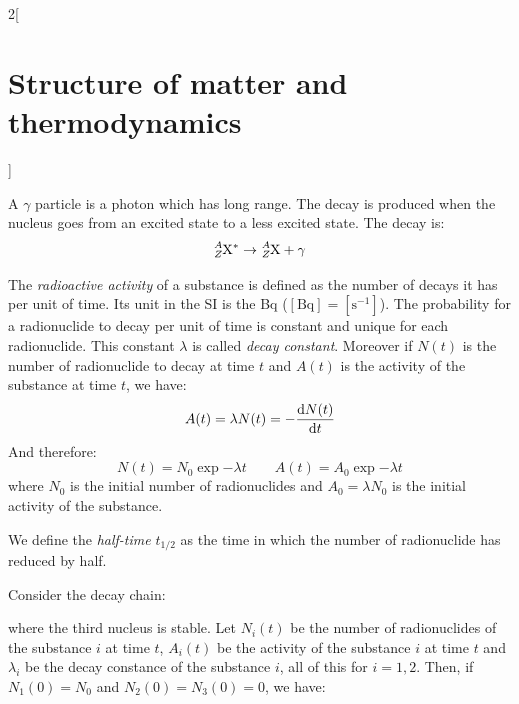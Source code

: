 \documentclass[../../../main.tex]{subfiles}
\begin{document}
\begin{multicols}{2}[\section{Structure of matter and thermodynamics}]
\begin{definition}
\begin{enumerate}
    \end{enumerate}
  \end{definition}
  \begin{definition}
    A $\gamma$ particle is a photon which has long range. The decay is produced when the nucleus goes from an excited state to a less excited state. The decay is: $$\ce{^$A$_$Z$X}^*\rightarrow\ce{^$A$_$Z$X}+\gamma$$
  \end{definition}
  \begin{definition}
    The \emph{radioactive activity} of a substance is defined as the number of decays it has per unit of time. Its unit in the SI is the Bq ($[\text{Bq}]=[\text{s}^{-1}]$). The probability for a radionuclide to decay per unit of time is constant and unique for each radionuclide. This constant $\lambda$ is called \emph{decay constant}. Moreover if $N(t)$ is the number of radionuclide to decay at time $t$ and $A(t)$ is the activity of the substance at time $t$, we have:
    $$A(t)=\lambda N(t)=-\dv{N(t)}{t}$$ And therefore:
    $$N(t)=N_0\exp{-\lambda t}\qquad A(t)=A_0\exp{-\lambda t}$$
    where $N_0$ is the initial number of radionuclides and $A_0=\lambda N_0$ is the initial activity of the substance.
  \end{definition}
  \begin{definition}
    We define the \emph{half-time} $t_{1/2}$ as the time in which the number of radionuclide has reduced by half.
  \end{definition}
  \begin{center}
    \begin{minipage}{\linewidth}
      \centering
      
    \end{minipage}
  \end{center}
  \begin{proposition}
    Consider the decay chain:
    \begin{center}
      \begin{minipage}{\linewidth}
        \centering
        
      \end{minipage}
    \end{center}
    where the third nucleus is stable.
    Let $N_i(t)$ be the number of radionuclides of the substance $i$ at time $t$, $A_i(t)$ be the activity of the substance $i$ at time $t$ and $\lambda_i$ be the decay constance of the substance $i$, all of this for $i=1,2$. Then, if $N_1(0)=N_0$ and $N_2(0)=N_3(0)=0$, we have:

\end{proposition}
\end{multicols}
\end{document}
